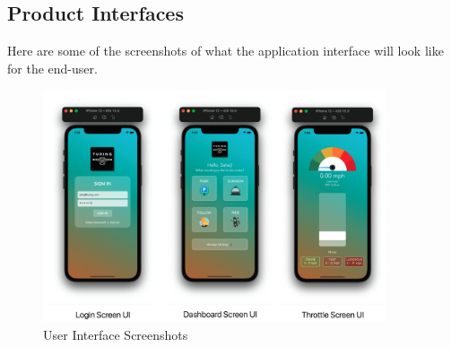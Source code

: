 \subsection{Product Interfaces}
Here are some of the screenshots of what the application interface will look like for the end-user. 
\begin{figure}
    \centering
    \includegraphics[width=0.9\textwidth]{images/UI.png} %
    \caption{User Interface Screenshots}
\end{figure}

